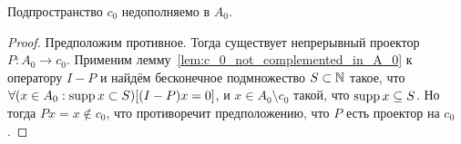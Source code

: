 \begin{theorem}
	Подпространство $c_0$ недополняемо в $A_0$.
\end{theorem}

\begin{proof}
	Предположим противное.
	Тогда существует непрерывный проектор $P: A_0 \to c_0$.
	Применим лемму~\ref{lem:c_0_not_complemented_in_A_0} к оператору $I-P$
	и найдём бесконечное подмножество $S\subset\mathbb{N}$ такое,
	что $\forall(x\in A_0 : \operatorname{supp} x \subset S)[(I-P)x = 0]$,
	и $x\in A_0 \setminus c_0$ такой, что $\operatorname{supp} x \subseteq S$.
	Но тогда  $Px = x\notin c_0$,
	что противоречит предположению, что $P$ есть проектор на $c_0$.
\end{proof}

